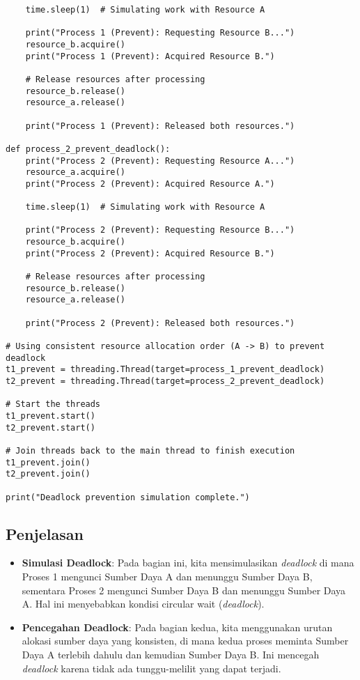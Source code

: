 \documentclass[12pt]{article}
\begin{document}
\begin{lstlisting}
    time.sleep(1)  # Simulating work with Resource A
    
    print("Process 1 (Prevent): Requesting Resource B...")
    resource_b.acquire()
    print("Process 1 (Prevent): Acquired Resource B.")
    
    # Release resources after processing
    resource_b.release()
    resource_a.release()
    
    print("Process 1 (Prevent): Released both resources.")

def process_2_prevent_deadlock():
    print("Process 2 (Prevent): Requesting Resource A...")
    resource_a.acquire()
    print("Process 2 (Prevent): Acquired Resource A.")
    
    time.sleep(1)  # Simulating work with Resource A
    
    print("Process 2 (Prevent): Requesting Resource B...")
    resource_b.acquire()
    print("Process 2 (Prevent): Acquired Resource B.")
    
    # Release resources after processing
    resource_b.release()
    resource_a.release()
    
    print("Process 2 (Prevent): Released both resources.")

# Using consistent resource allocation order (A -> B) to prevent deadlock
t1_prevent = threading.Thread(target=process_1_prevent_deadlock)
t2_prevent = threading.Thread(target=process_2_prevent_deadlock)

# Start the threads
t1_prevent.start()
t2_prevent.start()

# Join threads back to the main thread to finish execution
t1_prevent.join()
t2_prevent.join()

print("Deadlock prevention simulation complete.")
\end{lstlisting}

\subsection*{Penjelasan}
\begin{itemize}
    \item \textbf{Simulasi Deadlock}: Pada bagian ini, kita mensimulasikan \textit{deadlock} di mana Proses 1 mengunci Sumber Daya A dan menunggu Sumber Daya B, sementara Proses 2 mengunci Sumber Daya B dan menunggu Sumber Daya A. Hal ini menyebabkan kondisi circular wait (\textit{deadlock}).
    \item \textbf{Pencegahan Deadlock}: Pada bagian kedua, kita menggunakan urutan alokasi sumber daya yang konsisten, di mana kedua proses meminta Sumber Daya A terlebih dahulu dan kemudian Sumber Daya B. Ini mencegah \textit{deadlock} karena tidak ada tunggu-melilit yang dapat terjadi.

\end{itemize}
\end{document}
